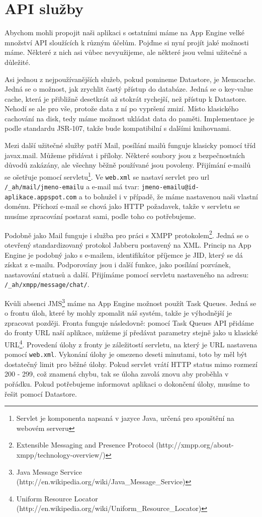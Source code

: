 \section{API služby}
Abychom mohli propojit naši aplikaci s ostatními máme na App Engine velké množství API sloužících k různým účelům. Pojďme si nyní projít jaké možnosti máme. Některé z nich asi vůbec nevyužijeme, ale některé jsou velmi užitečné a důležité.

Asi jednou z nejpoužívanějších služeb, pokud pomineme Datastore, je Memcache. Jedná se o možnost, jak zrychlit častý přístup do databáze. Jedná se o key-value cache, která je přibližně desetkrát až stokrát rychejší, než přístup k Datastore. Nehodí se ale pro vše, protože data z ní po vypršení zmizí. Místo klasického cachování na disk, tedy máme možnost ukládat data do paměti. Implementace je podle standardu JSR-107, takže bude kompatibilní s dalšími knihovnami.

Mezi další užitečné služby patří Mail, posílání mailů funguje klasicky pomocí tříd javax.mail. Můžeme přidávat i přílohy. Některé soubory jsou z bezpečnostních důvodů zakázány, ale všechny běžně používané jsou povoleny. Přijímání e-mailů se ošetřuje pomocí servletu\footnote{Servlet je komponenta napsaná v jazyce Java, určená pro spouštění na webovém serveru}. Ve \verb|web.xml| se nastaví servlet pro url \verb|/_ah/mail/jmeno-emailu| a e-mail má tvar: \verb|jmeno-emailu@id-aplikace.appspot.com| a to bohužel i v případě, že máme nastavenou naši vlastní doménu. Příchozí e-mail se chová jako HTTP požadavek, takže v servletu se musíme zpracování postarat sami, podle toho co potřebujeme. 

Podobně jako Mail funguje i služba pro práci s XMPP protokolem\footnote{Extensible Messaging and Presence Protocol (http://xmpp.org/about-xmpp/technology-overview/)}. Jedná se o otevřený standardizovaný protokol Jabberu postavený na XML. Princip na App Engine je podobný jako s e-mailem, identifikátor příjemce je JID, který se dá získat  z e-mailu. Podporovány jsou i další funkce, jako posílání pozvánek, nastavování statusů a další. Přijímáme pomocí servletu nastaveného na adresu: \verb|/_ah/xmpp/message/chat/|.

Kvůli absenci JMS\footnote{Java Message Service (http://en.wikipedia.org/wiki/Java\_Message\_Service)} máme na App Engine možnost použít Task Queues. Jedná se o frontu úloh, které by mohly zpomalit náš systém, takže je výhodnější je zpracovat později. Fronta funguje následovně: pomocí Task Queues API přidáme do fronty URL naší aplikace, můžeme jí předávat parametry stejně jako u klasické URL\footnote{Uniform Resource Locator (http://en.wikipedia.org/wiki/Uniform\_Resource\_Locator)}. Provedení úlohy z fronty je záležitostí servletu, na který je URL nastavena pomocí \verb|web.xml|. Vykonání úlohy je omezeno deseti minutami, toto by měl být dostatečný limit pro běžné úlohy. Pokud servlet vrátí HTTP status mimo rozmezí 200 - 299, což znamená chybu, tak se úloha zavolá znovu aby proběhla v pořádku. Pokud potřebujeme informovat aplikaci o dokončení úlohy, musíme to řešit pomocí Datastore.

